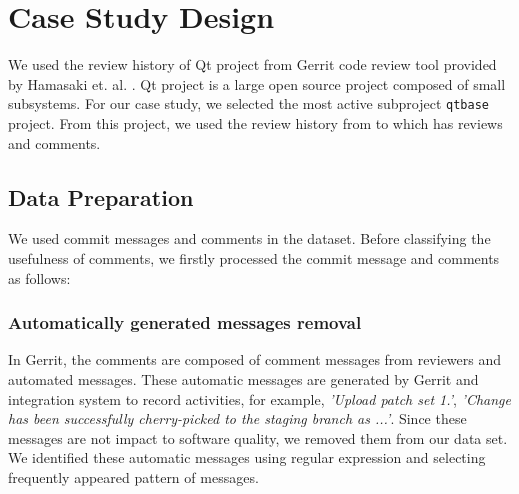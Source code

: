 \documentclass[conference]{IEEEtran}
\begin{document}
\section{Case Study Design}


We used the review history of Qt project from Gerrit code review tool provided by Hamasaki et. al. \cite{Hamasaki2013}. Qt project is a large open source project composed of small subsystems. For our case study, we selected the most active subproject \texttt{qtbase} project. From this project, we used the review history from  to  which has  reviews and  comments.




%



\subsection{Data Preparation}
We used commit messages and comments in the dataset. Before classifying the usefulness of comments, we firstly processed the commit message and comments as follows: 

\subsubsection{Automatically generated messages removal}
In Gerrit, the comments are composed of comment messages from reviewers and automated messages. These automatic messages are generated by Gerrit and integration system to record activities, for example, \textit{'Upload patch set 1.'}, \textit{'Change has been successfully cherry-picked to the staging branch as ...'}. Since these messages are not impact to software quality\cite{Mcintosh}, we removed them from our data set. We identified these automatic messages using regular expression and selecting frequently appeared pattern of messages.  
\end{document}
